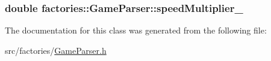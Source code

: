 \hypertarget{classfactories_1_1GameParser_a22d4c56cbf9304bede16b232f814f95c}{
\subsubsection[{speed\-Multiplier\-\_\-}]{\setlength{\rightskip}{0pt plus 5cm}double {\bf factories\-::\-Game\-Parser\-::speed\-Multiplier\-\_\-}}}\label{d0/dc6/classfactories_1_1GameParser_a22d4c56cbf9304bede16b232f814f95c}


\-The documentation for this class was generated from the following file\-:\begin{DoxyCompactItemize}
\item 
src/factories/\hyperlink{GameParser_8h}{\-Game\-Parser.\-h}\end{DoxyCompactItemize}
